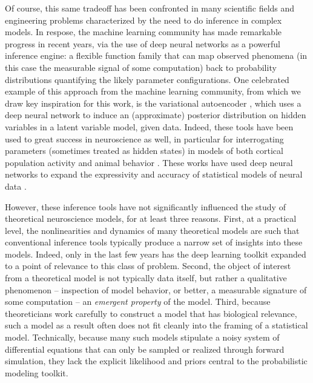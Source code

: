 \documentclass[11pt]{article}
\begin{document}
Of course, this same tradeoff has been confronted in many scientific fields and engineering problems characterized by the need to do inference in complex models.  
In respose, the machine learning community has made remarkable progress in recent years, via the use of deep neural networks as a powerful inference engine: a flexible function family that can map observed phenomena (in this case the measurable signal of some computation) back to probability distributions quantifying the likely parameter configurations.  
One celebrated example of this approach from the machine learning community, from which we draw key inspiration for this work, is the variational autoencoder \cite{kingma2013auto, rezende2014stochastic}, which uses a deep neural network to induce an (approximate) posterior distribution on hidden variables in a latent variable model, given data. 
Indeed, these tools have been used to great success in neuroscience as well, in particular for interrogating parameters (sometimes treated as hidden states) in models of both cortical population activity \cite{gao2016linear, zhao2017recursive, barello2018sparse, pandarinath2018inferring} and animal behavior \cite{wiltschko2015mapping, johnson2016composing, batty2019behavenet}. 
These works have used deep neural networks to expand the expressivity and accuracy of statistical models of neural data \cite{paninski2018neural}. 

However, these inference tools have not significantly influenced the study of theoretical neuroscience models, for at least three reasons.  
First, at a practical level, the nonlinearities and dynamics of many theoretical models are such that conventional inference tools typically produce a narrow set of insights into these models.  
Indeed, only in the last few years has the deep learning toolkit expanded to a point of relevance to this class of problem.
Second, the object of interest from a theoretical model is not typically data itself, but rather a qualitative phenomenon -- inspection of model behavior, or better, a measurable signature of some computation -- an \emph{emergent property} of the model.  
Third, because theoreticians work carefully to construct a model that has biological relevance, such a model as a result often does not fit cleanly into the framing of a statistical model.  
Technically, because many such models stipulate a noisy system of differential equations that can only be sampled or realized through forward simulation, they lack the explicit likelihood and priors central to the probabilistic modeling toolkit.  
\end{document}
